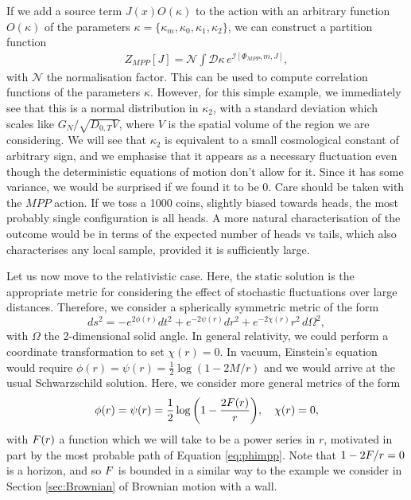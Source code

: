\documentclass[aps,pra,amsmath,amssymb,amsthm,floatfix,nofootinbib,notitlepage,superscriptaddress,10pt]{revtex4-2}
\def\actionC{\mathcal{I}}
\begin{document}
If we add a source term $J(x)O(\kappa)$ to the action with an arbitrary function $O(\kappa)$ of the parameters $\kappa=\{\kappa_m,\kappa_0,\kappa_1,\kappa_2\}$, we can construct a partition function
\begin{align}
    Z_{MPP}[J]=\mathcal{N}\int \mathcal{D}\kappa\, e^{\actionC[\Phi_{MPP},m,J]},
\end{align}
with $\mathcal{N}$ the normalisation factor. This
can be used to compute correlation functions of the parameters $\kappa$. However, for this simple example, we immediately see that this is a normal distribution in $\kappa_2$, with a standard deviation which scales like $G_N/\sqrt{D_{0,T} V}$, where $V$ is the spatial volume of the region we are considering.
We will see that $\kappa_2$ is equivalent to a small cosmological constant of arbitrary sign, and we emphasise that it appears as a necessary fluctuation even though the deterministic equations of motion don't allow for it. Since it has some variance, we would be surprised if we found it to be $0$. Care should be taken with the $MPP$ action. If we toss a 1000 coins, slightly biased towards heads, the most probably single configuration is all heads. A more natural characterisation of the outcome would be in terms of the expected number of heads vs tails, which also characterises any local sample, provided it is sufficiently large.



Let us now move to the relativistic case. Here, the static solution is the appropriate metric for considering the effect of stochastic fluctuations over large distances. 
Therefore, we consider a spherically symmetric metric of the form
  \begin{equation}
        ds^2=-e^{2\phi(r)}dt^2+e^{-2\psi(r)}dr^2+e^{-2 \chi(r)}r^2\,d\Omega^2,
        \label{eq:themetric}
    \end{equation}
with $\Omega$ the 2-dimensional solid angle. 
In general relativity, we could perform a coordinate transformation to set $\chi(r)=0$. In vacuum, Einstein's equation would require $\phi(r)=\psi(r)=\frac{1}{2}\log(1-2M/r)$ and we would arrive at the usual Schwarzschild solution. Here, we consider more general metrics of the form
\begin{align}
    \phi(r)=\psi(r)=\frac{1}{2}\log{\left(1-\frac{2F(r)}{r}\right)},\quad \chi(r)=0,
    \label{eq:Fansatz}
\end{align}
with $F(r)$ a function which we will take to be a power series in $r$, motivated in part by the most probable path of Equation \eqref{eq:phimpp}. 
Note that $1-2F/r=0$ is a horizon, and so $F$ is bounded in a similar way to the example we consider in Section \ref{sec:Brownian} of Brownian motion with a wall.
\end{document}
